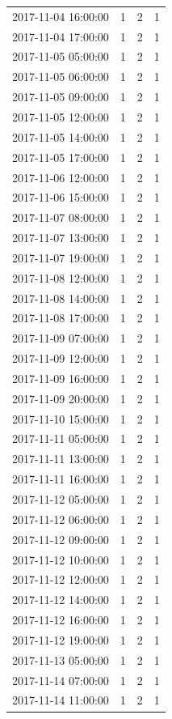 \begin{tabular}{lrrr}
2017-11-04 16:00:00 & 1 & 2 & 1 \\
2017-11-04 17:00:00 & 1 & 2 & 1 \\
2017-11-05 05:00:00 & 1 & 2 & 1 \\
2017-11-05 06:00:00 & 1 & 2 & 1 \\
2017-11-05 09:00:00 & 1 & 2 & 1 \\
2017-11-05 12:00:00 & 1 & 2 & 1 \\
2017-11-05 14:00:00 & 1 & 2 & 1 \\
2017-11-05 17:00:00 & 1 & 2 & 1 \\
2017-11-06 12:00:00 & 1 & 2 & 1 \\
2017-11-06 15:00:00 & 1 & 2 & 1 \\
2017-11-07 08:00:00 & 1 & 2 & 1 \\
2017-11-07 13:00:00 & 1 & 2 & 1 \\
2017-11-07 19:00:00 & 1 & 2 & 1 \\
2017-11-08 12:00:00 & 1 & 2 & 1 \\
2017-11-08 14:00:00 & 1 & 2 & 1 \\
2017-11-08 17:00:00 & 1 & 2 & 1 \\
2017-11-09 07:00:00 & 1 & 2 & 1 \\
2017-11-09 12:00:00 & 1 & 2 & 1 \\
2017-11-09 16:00:00 & 1 & 2 & 1 \\
2017-11-09 20:00:00 & 1 & 2 & 1 \\
2017-11-10 15:00:00 & 1 & 2 & 1 \\
2017-11-11 05:00:00 & 1 & 2 & 1 \\
2017-11-11 13:00:00 & 1 & 2 & 1 \\
2017-11-11 16:00:00 & 1 & 2 & 1 \\
2017-11-12 05:00:00 & 1 & 2 & 1 \\
2017-11-12 06:00:00 & 1 & 2 & 1 \\
2017-11-12 09:00:00 & 1 & 2 & 1 \\
2017-11-12 10:00:00 & 1 & 2 & 1 \\
2017-11-12 12:00:00 & 1 & 2 & 1 \\
2017-11-12 14:00:00 & 1 & 2 & 1 \\
2017-11-12 16:00:00 & 1 & 2 & 1 \\
2017-11-12 19:00:00 & 1 & 2 & 1 \\
2017-11-13 05:00:00 & 1 & 2 & 1 \\
2017-11-14 07:00:00 & 1 & 2 & 1 \\
2017-11-14 11:00:00 & 1 & 2 & 1 \\

\end{tabular}
